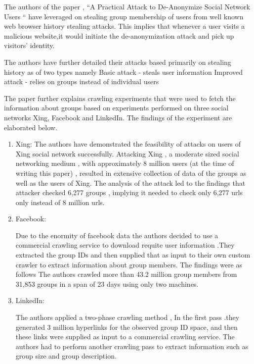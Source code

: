 \documentclass{article}
\begin{document}
\begin {flushleft}
The authors of the paper , “A Practical Attack to De-Anonymize Social Network Users “  have leveraged on stealing group membership of users from well known web browser history stealing attacks. This implies that whenever a user visits a malicious website,it would initiate the de-anonymization attack and pick up visitors’ identity.


The authors have further detailed their attacks based primarily on stealing history as of two types namely
 Basic attack - steals user information
 Improved attack - relies on groups instead of individual users


The paper further explains crawling experiments that were used to fetch the information about 
groups based on experiments performed on three social networks Xing, Facebook and LinkedIn. The findings of the experiment are elaborated below.

\begin{enumerate}

\item  Xing: 
The authors have demonstrated the feasibility of attacks on users of Xing social network successfully. Attacking  Xing , a moderate sized social networking medium , with approximately 8 million users (at the time of writing this paper) , resulted in extensive collection of data of the groups as well as the users of Xing. The analysis of the attack led to the findings that attacker checked 6,277 groups , implying it needed to check only 6,277 urls only instead of 8 million urls.

\item Facebook:

 Due to the enormity of facebook data the authors  decided to use a commercial crawling service to download requite user information .They extracted the group IDs and then supplied that as input to their own custom crawler to extract information about group members. The findings were as follows
The authors crawled more than  43.2 million group members from 31,853 groups in a span of 23 days using only two machines.

\item LinkedIn: 



The authors applied a  two-phase crawling method , In the first pass .they  generated 3 million hyperlinks for the observed group ID space, and then these links were supplied as input to a commercial crawling service. The authors had to perform another  crawling pass to extract information such as  group size and group description.


\end{enumerate}
\end{flushleft}
\end{document}
